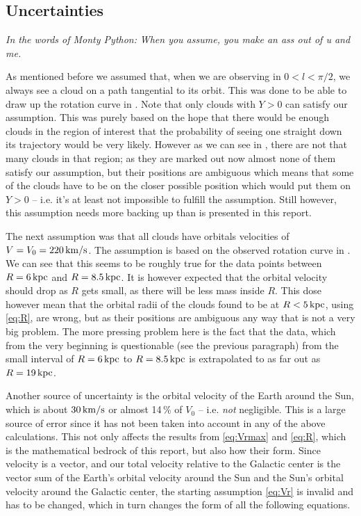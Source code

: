 \documentclass[11pt,a4paper, twocolumn,
swedish, english %
]{article}
\begin{document}
\subsection{Uncertainties}
\textsl{In the words of Monty Python:} \textit{When you assume, you
  make an ass out of u and me.}

As mentioned before we assumed that, when we are observing in
$0<l<\pi/2$, we always see a cloud on a path tangential to its
orbit. This was done to be able to draw up the rotation curve in
. Note that only clouds with $Y>0$ can satisfy our
assumption. 
This was purely based on the hope that there would
be enough clouds in the region of interest that the probability of
seeing one straight down its trajectory would be very likely.
However as we can see in , there are not that many
clouds in that region; as they are marked out now almost none of them
satisfy our assumption, but their positions are ambiguous which means
that some of the clouds have to be on the closer possible position
which would put them on $Y>0$ -- i.e. it's at least not impossible to
fulfill the assumption. Still however, this assumption needs more
backing up than is presented in this report. 

The next assumption was that all clouds have orbitals velocities of
$V=V_0=\unit[220]{km/s}$. The assumption is based on the observed
rotation curve in . We can see that this seems to be
roughly true for the data points between $R=\unit[6]{kpc}$ and
$R=\unit[8.5]{kpc}$. It is however expected that the orbital velocity
should drop as $R$ gets small, as there will be less mass inside
$R$. This dose however mean that the orbital radii of the clouds found
to be at $R<\unit[5]{kpc}$, using \eqref{eq:R}, are wrong, but as
their positions are ambiguous any way that is not a very big
problem. The more pressing problem here is the fact that the data,
which from the very beginning is questionable (see the previous
paragraph) from the small interval of $R=\unit[6]{kpc}$ to
$R=\unit[8.5]{kpc}$ is extrapolated to as far out as
$R=\unit[19]{kpc}$.

Another source of uncertainty is the orbital velocity of the Earth
around the Sun, which is about $\unit[30]{km/s}$ or almost 14\,\% of
$V_0$ -- i.e. \emph{not} negligible. This is a large source of error
since it has not been taken into account in any of the above
calculations. This not only affects the results from \eqref{eq:Vrmax}
and \eqref{eq:R}, which is the mathematical bedrock of this report,
but also how their form. Since velocity is a vector, and our total
velocity relative to the Galactic center is the vector sum of the
Earth's orbital velocity around the Sun and the Sun's orbital velocity
around the Galactic center, the starting assumption \eqref{eq:Vr} is
invalid and has to be changed, which in turn changes the form of all
the following equations.
\end{document}
